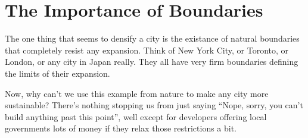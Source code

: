 \documentclass{book}
\begin{document}
    \chapter{The Importance of Boundaries}
    The one thing that seems to densify a city is the existance of natural boundaries that completely resist any expansion.
    Think of New York City, or Toronto, or London, or any city in Japan really.
    They all have very firm boundaries defining the limits of their expansion.

    Now, why can't we use this example from nature to make any city more sustainable?
    There's nothing stopping us from just saying ``Nope, sorry, you can't build anything past this point'', well except for developers offering local governments lots of money if they relax those restrictions a bit.
    
\end{document}
